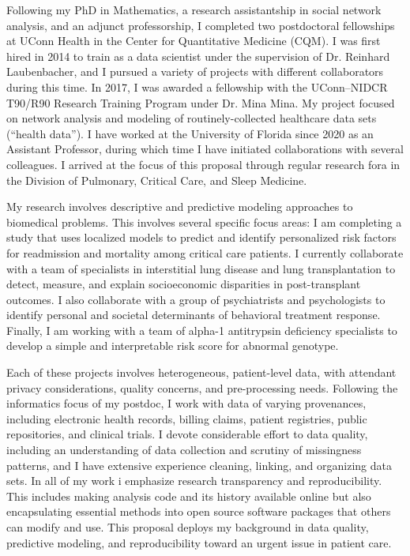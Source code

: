 \documentclass{nihbiosketch}
\begin{document}
\begin{statement}

Following my PhD in Mathematics, a research assistantship in social network analysis, and an adjunct professorship, I completed two postdoctoral fellowships at UConn Health in the Center for Quantitative Medicine (CQM).
I was first hired in 2014 to train as a data scientist under the supervision of Dr. Reinhard Laubenbacher, and I pursued a variety of projects with different collaborators during this time.
In 2017, I was awarded a fellowship with the UConn--NIDCR T90/R90 Research Training Program under Dr. Mina Mina. My project focused on network analysis and modeling of routinely-collected healthcare data sets (``health data'').
I have worked at the University of Florida since 2020 as an Assistant Professor, during which time I have initiated collaborations with several colleagues. I arrived at the focus of this proposal through regular research fora in the Division of Pulmonary, Critical Care, and Sleep Medicine.

My research involves descriptive and predictive modeling approaches to biomedical problems.
This involves several specific focus areas:
I am completing a study that uses localized models to predict and identify personalized risk factors for readmission and mortality among critical care patients.
I currently collaborate with a team of specialists in interstitial lung disease and lung transplantation to detect, measure, and explain socioeconomic disparities in post-transplant outcomes.
I also collaborate with a group of psychiatrists and psychologists to identify personal and societal determinants of behavioral treatment response.
Finally, I am working with a team of alpha-1 antitrypsin deficiency specialists to develop a simple and interpretable risk score for abnormal genotype.

Each of these projects involves heterogeneous, patient-level data, with attendant privacy considerations, quality concerns, and pre-processing needs.
Following the informatics focus of my postdoc, I work with data of varying provenances, including electronic health records, billing claims, patient registries, public repositories, and clinical trials.
I devote considerable effort to data quality, including an understanding of data collection and scrutiny of missingness patterns, and I have extensive experience cleaning, linking, and organizing data sets.
In all of my work i emphasize research transparency and reproducibility. This includes making analysis code and its history available online but also encapsulating essential methods into open source software packages that others can modify and use.
This proposal deploys my background in data quality, predictive modeling, and reproducibility toward an urgent issue in patient care.



\end{statement}
\end{document}
